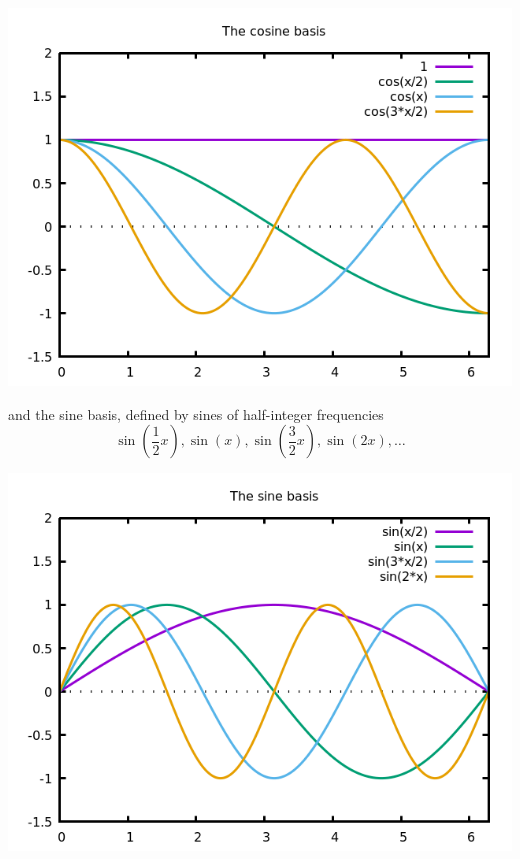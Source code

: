 \includegraphics{cos.png}


and the sine basis, defined by sines of half-integer frequencies
$$
\sin\left(\frac{1}{2}x\right),
\sin(x),
\sin\left(\frac{3}{2}x\right),
\sin(2x), \ldots
$$

\includegraphics{sin.png}


